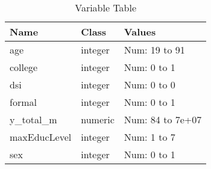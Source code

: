 \begin{table}[!htbp] \centering \renewcommand*{\arraystretch}{1.1}\caption{Variable Table}
\begin{tabular}{p{}p{}p{}}
\hline
\hline
Name & Class & Values \\ 
\hline
age & integer & Num: 19 to 91 \\ 
college & integer & Num: 0 to 1 \\ 
dsi & integer & Num: 0 to 0 \\ 
formal & integer & Num: 0 to 1 \\ 
y\_total\_m & numeric & Num: 84 to 7e+07 \\ 
maxEducLevel & integer & Num: 1 to 7 \\ 
sex & integer & Num: 0 to 1\\ 
\hline
\hline
\end{tabular}
\end{table}

